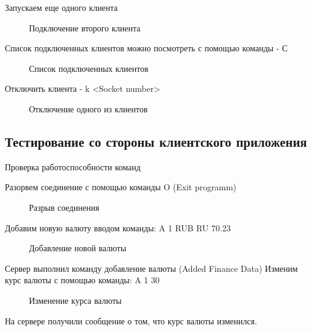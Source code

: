 \documentclass[a4paper,14pt]{article}
\begin{document}
Запускаем еще одного клиента

\begin{figure}[h!]
	\noindent\centering{
		\texttt{[image: 2]}}
	\caption{Подключение второго клиента}
	\label{figCurves}
\end{figure}

Список подключенных клиентов можно посмотреть с помощью команды - С

\begin{figure}[h!]
	\noindent\centering{
		\texttt{[image: 3]}}
	\caption{Список подключенных клиентов}
	\label{figCurves}
\end{figure}

Отключить клиента - k <Socket number>

\begin{figure}[h!]
	\noindent\centering{
		\texttt{[image: 4]}}
	\caption{Отключение одного из клиентов}
	\label{figCurves}
\end{figure}



\newpage

\subsection{Тестирование со стороны клиентского приложения}

Проверка работоспособности команд

Разорвем соединение с помощью команды O (Exit programm)
\begin{figure}[h!]
	\noindent\centering{
		\texttt{[image: 21]}}
	\caption{Разрыв соединения}
	\label{figCurves}
\end{figure}

Добавим новую валюту вводом команды: A 1 RUB RU 70.23

\begin{figure}[h!]
	\noindent\centering{
		\texttt{[image: 5]}}
	\caption{Добавление новой валюты}
	\label{figCurves}
\end{figure}

Сервер выполнил команду добавление валюты (Added Finance Data)
\newpage
Изменим курс валюты с помощью команды: A 1 30
\begin{figure}[h!]
	\noindent\centering{
		\texttt{[image: 6]}}
	\caption{Изменение курса валюты}
	\label{figCurves}
\end{figure}

На сервере получили сообщение о том, что курс валюты изменился. 
\end{document}

